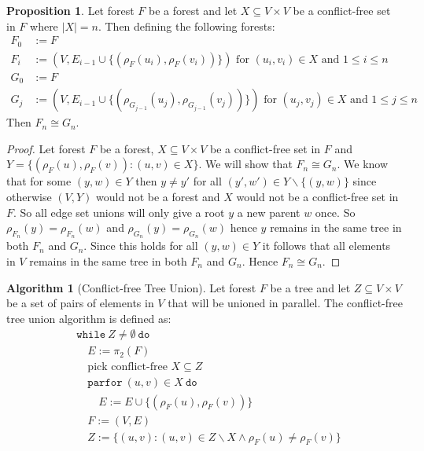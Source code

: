 \documentclass[a4paper,12pt]{article}
\theoremstyle{definition}
\newtheorem{proposition}{Proposition}[section]
\newtheorem{algorithm}{Algorithm}[section]
\newcommand{\kw}[1]{\ensuremath{\mathtt{#1}}}
\begin{document}
\begin{proposition}
    Let forest $F$ be a forest and let $X \subseteq V \times V$ be a
    conflict-free set in $F$ where $|X| = n$. Then defining the following forests:
    \begin{align*}
        F_0 &:= F \\
        F_{i} &:= (V, E_{i - 1} \cup \{(\rho_F(u_i), \rho_F(v_i))\}) \text{ for } (u_i, v_i) \in X \text{ and } 1 \leq i \leq n \\
        G_0 &:= F \\
        G_{j} &:= (V, E_{i - 1} \cup \{(\rho_{G_{j - 1}}(u_j), \rho_{G_{j - 1}}(v_j))\}) \text{ for } (u_j, v_j) \in X \text{ and } 1 \leq j \leq n
    \end{align*}
    Then $F_{n} \cong G_{n}$.
\end{proposition}
\begin{proof}
    Let forest $F$ be a forest, $X \subseteq V \times V$ be a conflict-free set
    in $F$ and $Y = \{(\rho_F(u), \rho_F(v)) : (u, v) \in X\}$. We will show
    that $F_n \cong G_n$. We know that for some $(y, w) \in Y$ then $y \neq y'$
    for all  $(y', w') \in Y \backslash \{(y, w)\}$ since otherwise $(V, Y)$
    would not be a forest and $X$ would not be a conflict-free set in $F$. So
    all edge set unions will only give a root $y$ a new parent $w$ once. So
    $\rho_{F_n}(y) = \rho_{F_n}(w)$ and $\rho_{G_n}(y) = \rho_{G_n}(w)$ hence
    $y$ remains in the same tree in both $F_n$ and $G_n$. Since this holds for
    all $(y, w) \in Y$ it follows that all elements in $V$ remains in the same
    tree in both $F_n$ and $G_n$. Hence $F_n \cong G_n$.
\end{proof}

\begin{algorithm}[Conflict-free Tree Union]
    Let forest $F$ be a tree and let $Z \subseteq V \times V$ be a set of pairs
    of elements in $V$ that will be unioned in parallel. The conflict-free tree
    union algorithm is defined as:
    \begin{align*}
        & \kw{while} \: Z \neq \emptyset \: \kw{do} \\
        & \quad E := \pi_2(F) \\
        & \quad \text{pick conflict-free } X \subseteq Z \\
        & \quad \kw{parfor} \: (u, v) \in X \: \kw{do} \\
        & \quad \quad E := E \cup \{(\rho_F(u), \rho_F(v))\} \\
        & \quad F := (V, E) \\
        & \quad Z := \{(u, v) : (u, v) \in Z \backslash X \land \rho_F(u) \neq \rho_F(v)\} \\
    \end{align*}
\end{algorithm}
\end{document}
